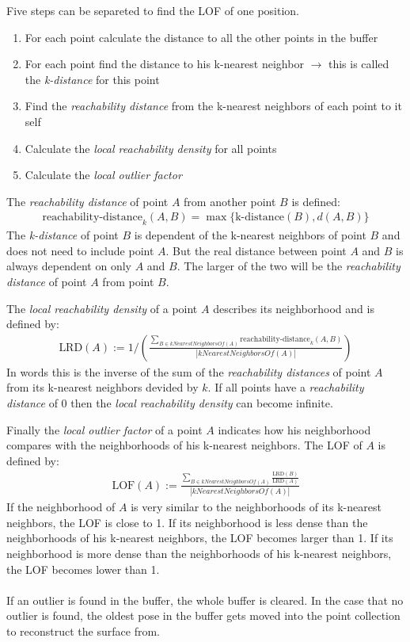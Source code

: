 Five steps can be separeted to find the LOF of one position.
\begin{enumerate}
  \item{For each point calculate the distance to all the other points in the buffer}
  \item{For each point find the distance to his k-nearest neighbor $\rightarrow$
    this is called the \textit{k-distance} for this point}
  \item{Find the \textit{reachability distance} from the k-nearest neighbors
      of each point to it self}
  \item{Calculate the \textit{local reachability density} for all points}
  \item{Calculate the \textit{local outlier factor}}
\end{enumerate}
The \textit{reachability distance} of point $A$ from another point $B$ is defined:
\begin{gather*}
  \mbox{reachability-distance}_k(A,B)=\max\{\mbox{k-distance}(B), d(A,B)\}
\end{gather*}
The \textit{k-distance} of point $B$ is dependent of the k-nearest neighbors of point $B$
and does not need to include point $A$.
But the real distance between point $A$ and $B$ is always dependent on only $A$
and $B$. The larger of the two will be the \textit{reachability distance} of
point $A$ from point $B$.

The \textit{local reachability density} of a point $A$ describes its neighborhood
and is defined by:
\begin{gather*}
  \mbox{LRD}(A):=1/\left(\frac{\sum_{B\in kNearestNeighborsOf(A)}\mbox{reachability-distance}_k(A, B)}{|kNearestNeighborsOf(A)|}\right)
\end{gather*}
In words this is the inverse of the sum of the \textit{reachability distances} of point $A$
from its k-nearest neighbors devided by $k$. If all points have a
\textit{reachability distance} of 0 then the \textit{local reachability density}
can become infinite.

Finally the \textit{local outlier factor} of a point $A$ indicates how his
neighborhood compares with the neighborhoods of his k-nearest neighbors. The LOF
of $A$ is defined by:
\begin{gather*}
  \mbox{LOF}(A):=\frac{\sum_{B\in kNearestNeighborsOf(A)}\frac{\mbox{LRD}(B)}{\mbox{LRD}(A)}}{|kNearestNeighborsOf(A)|}
\end{gather*}
If the neighborhood of $A$ is very similar to the neighborhoods of its k-nearest
neighbors, the LOF is close to 1. If its neighborhood is less dense than the
neighborhoods of his k-nearest neighbors, the LOF becomes larger than 1. If its
neighborhood is more dense than the neighborhoods of his k-nearest neighbors,
the LOF becomes lower than 1. \\
 \\
If an outlier is found in the buffer, the whole buffer is cleared. In the case
that no outlier is found, the oldest pose in the buffer gets moved into the
point collection to reconstruct the surface from.
